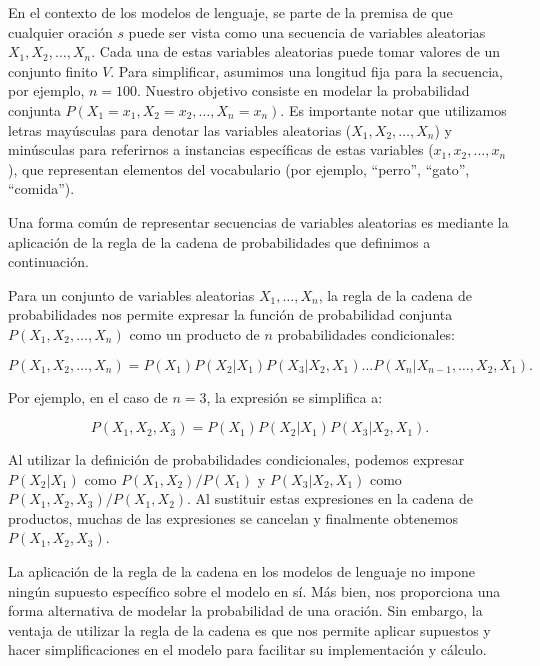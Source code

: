 En el contexto de los modelos de lenguaje, se parte de la premisa de que cualquier oración $s$ puede ser vista como una secuencia de variables aleatorias $X_1, X_2, \ldots, X_n$. Cada una de estas variables aleatorias puede tomar valores de un conjunto finito $V$. Para simplificar, asumimos una longitud fija para la secuencia, por ejemplo, $n = 100$. Nuestro objetivo consiste en modelar la probabilidad conjunta $P(X_1 = x_1, X_2 = x_2, \ldots, X_n = x_n)$. Es importante notar que utilizamos letras mayúsculas para denotar las variables aleatorias ($X_1, X_2, \ldots, X_n$) y minúsculas para referirnos a instancias específicas de estas variables ($x_1, x_2, \ldots, x_n$), que representan elementos del vocabulario (por ejemplo, ``perro'', ``gato'', ``comida'').

Una forma común de representar secuencias de variables aleatorias es mediante la aplicación de la regla de la cadena de probabilidades que definimos a continuación.

Para un conjunto de variables aleatorias $X_1,\ldots, X_n$, la regla de la cadena de probabilidades nos permite expresar la función de probabilidad conjunta $P(X_1,X_2,\ldots, X_n)$ como un producto de $n$ probabilidades condicionales:

\begin{equation}
P(X_1,X_2,\ldots,X_n)=P(X_1)P(X_2|X_1)P(X_3|X_2,X_1)\ldots P(X_n|X_{n-1},\ldots,X_2,X_1).
\end{equation}

Por ejemplo, en el caso de $n=3$, la expresión se simplifica a:

\begin{displaymath}
P(X_1,X_2,X_3)=P(X_1)P(X_2|X_1)P(X_3|X_2,X_1).
\end{displaymath}

Al utilizar la definición de probabilidades condicionales, podemos expresar $P(X_2|X_1)$ como $P(X_1,X_2)/P(X_1)$ y $P(X_3|X_2,X_1)$ como $P(X_1,X_2,X_3)/P(X_1,X_2)$. Al sustituir estas expresiones en la cadena de productos, muchas de las expresiones se cancelan y finalmente obtenemos $P(X_1,X_2,X_3)$.     

La aplicación de la regla de la cadena en los modelos de lenguaje no impone ningún supuesto específico sobre el modelo en sí. Más bien, nos proporciona una forma alternativa de modelar la probabilidad de una oración. Sin embargo, la ventaja de utilizar la regla de la cadena es que nos permite aplicar supuestos y hacer simplificaciones en el modelo para facilitar su implementación y cálculo.

